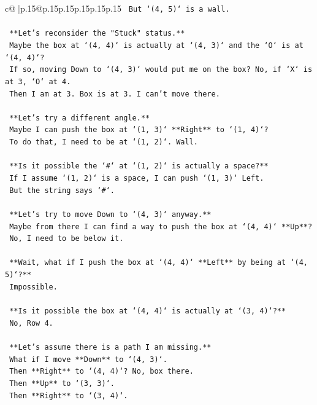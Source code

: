 \documentclass{article}
\begin{document}
{\begin{supertabular}{c@{$\;$}|p{.15\linewidth}@{}p{.15\linewidth}p{.15\linewidth}p{.15\linewidth}p{.15\linewidth}p{.15\linewidth}}
{{{\texttt{    But `(4, 5)` is a wall.} \\
\\ 
\texttt{    **Let's reconsider the "Stuck" status.**} \\
\texttt{    Maybe the box at `(4, 4)` is actually at `(4, 3)` and the `O` is at `(4, 4)`?} \\
\texttt{    If so, moving Down to `(4, 3)` would put me on the box? No, if `X` is at 3, `O` at 4.} \\
\texttt{    Then I am at 3. Box is at 3. I can't move there.} \\
\\ 
\texttt{    **Let's try a different angle.**} \\
\texttt{    Maybe I can push the box at `(1, 3)` **Right** to `(1, 4)`?} \\
\texttt{    To do that, I need to be at `(1, 2)`. Wall.} \\
\\ 
\texttt{    **Is it possible the `\#` at `(1, 2)` is actually a space?**} \\
\texttt{    If I assume `(1, 2)` is a space, I can push `(1, 3)` Left.} \\
\texttt{    But the string says `\#`.} \\
\\ 
\texttt{    **Let's try to move Down to `(4, 3)` anyway.**} \\
\texttt{    Maybe from there I can find a way to push the box at `(4, 4)` **Up**?} \\
\texttt{    No, I need to be below it.} \\
\\ 
\texttt{    **Wait, what if I push the box at `(4, 4)` **Left** by being at `(4, 5)`?**} \\
\texttt{    Impossible.} \\
\\ 
\texttt{    **Is it possible the box at `(4, 4)` is actually at `(3, 4)`?**} \\
\texttt{    No, Row 4.} \\
\\ 
\texttt{    **Let's assume there is a path I am missing.**} \\
\texttt{    What if I move **Down** to `(4, 3)`.} \\
\texttt{    Then **Right** to `(4, 4)`? No, box there.} \\
\texttt{    Then **Up** to `(3, 3)`.} \\
\texttt{    Then **Right** to `(3, 4)`.} \\
}}}
\end{supertabular}}
\end{document}
